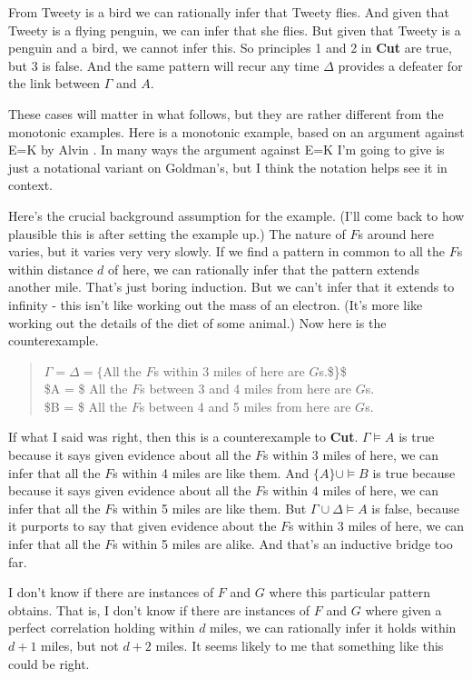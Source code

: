 \documentclass[11pt,]{book}
\begin{document}
From Tweety is a bird we can rationally infer that Tweety flies. And given that Tweety is a flying penguin, we can infer that she flies. But given that Tweety is a penguin and a bird, we cannot infer this. So principles 1 and 2 in \textbf{Cut} are true, but 3 is false. And the same pattern will recur any time \(\Delta\) provides a defeater for the link between \(\Gamma\) and \(A\).

These cases will matter in what follows, but they are rather different from the monotonic examples. Here is a monotonic example, based on an argument against E=K by Alvin \citet{Goldman2009}. In many ways the argument against E=K I'm going to give is just a notational variant on Goldman's, but I think the notation helps see it in context.

Here's the crucial background assumption for the example. (I'll come back to how plausible this is after setting the example up.) The nature of \(F\)s around here varies, but it varies very very slowly. If we find a pattern in common to all the \(F\)s within distance \(d\) of here, we can rationally infer that the pattern extends another mile. That's just boring induction. But we can't infer that it extends to infinity - this isn't like working out the mass of an electron. (It's more like working out the details of the diet of some animal.) Now here is the counterexample.

\begin{quote}
\(\Gamma = \Delta = \{\)All the \(F\)s within 3 miles of here are \(G\)s.\$\}\$\\
\$A = \$ All the \(F\)s between 3 and 4 miles from here are \(G\)s.\\
\$B = \$ All the \(F\)s between 4 and 5 miles from here are \(G\)s.
\end{quote}

If what I said was right, then this is a counterexample to \textbf{Cut}. \(\Gamma \vDash A\) is true because it says given evidence about all the \(F\)s within 3 miles of here, we can infer that all the \(F\)s within 4 miles are like them. And \(\{A\} \cup \vDash B\) is true because because it says given evidence about all the \(F\)s within 4 miles of here, we can infer that all the \(F\)s within 5 miles are like them. But \(\Gamma \cup \Delta \vDash A\) is false, because it purports to say that given evidence about the \(F\)s within 3 miles of here, we can infer that all the \(F\)s within 5 miles are alike. And that's an inductive bridge too far.

I don't know if there are instances of \(F\) and \(G\) where this particular pattern obtains. That is, I don't know if there are instances of \(F\) and \(G\) where given a perfect correlation holding within \(d\) miles, we can rationally infer it holds within \(d + 1\) miles, but not \(d + 2\) miles. It seems likely to me that something like this could be right.
\end{document}
